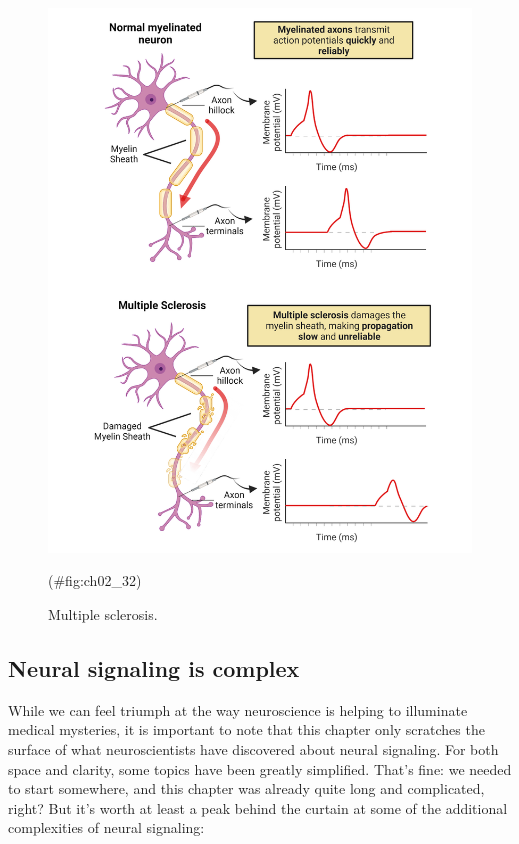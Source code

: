 \documentclass[
]{book}
\begin{document}
\begin{figure}

{\centering \includegraphics[width=0.8\linewidth]{images/ch02/02_31} 

}

\caption{Multiple sclerosis.}(\#fig:ch02_32)
\end{figure}

\hypertarget{neural-signaling-is-complex}{%
\subsection{Neural signaling is complex}\label{neural-signaling-is-complex}}

While we can feel triumph at the way neuroscience is helping to illuminate medical mysteries, it is important to note that this chapter only scratches the surface of what neuroscientists have discovered about neural signaling. For both space and clarity, some topics have been greatly simplified. That's fine: we needed to start somewhere, and this chapter was already quite long and complicated, right? But it's worth at least a peak behind the curtain at some of the additional complexities of neural signaling:
\end{document}
